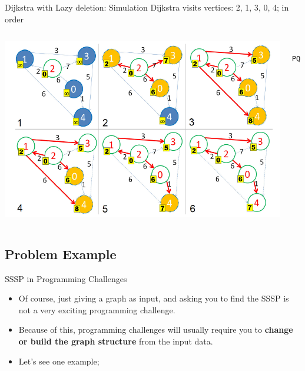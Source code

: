 \begin{frame}[fragile]{Dijkstra with Lazy deletion: Simulation}
  Dijkstra visits vertices: 2, 1, 3, 0, 4; in order
  \begin{columns}[T]
    \begin{center}
      \includegraphics[width=.9\textwidth]{../img/dijkstra_halim}
    \end{center}
\begin{verbatim}
 PQ:
\end{verbatim}
  \end{columns}
\end{frame}

\subsection{Problem Example}

\begin{frame}{SSSP in Programming Challenges}
  \begin{itemize}
    \item Of course, just giving a graph as input, and asking you to find the SSSP is not a very exciting programming challenge. \bigskip

    \item Because of this, programming challenges will usually require you to {\bf change or build the graph structure} from the input data.\bigskip

    \item Let's see one example;
  \end{itemize}
\end{frame}

